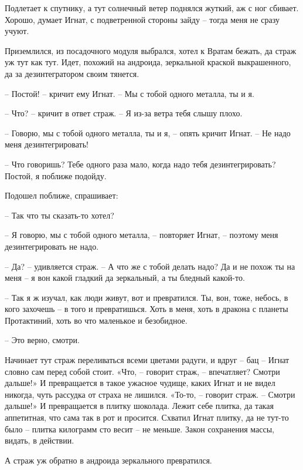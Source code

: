 \documentclass[ebook,oneside,final,openright]{memoir}
\begin{document}
\par
Подлетает к спутнику, а тут солнечный ветер поднялся жуткий, аж с ног сбивает. Хорошо, думает Игнат, с подветренной стороны зайду – тогда меня не сразу учуют. \par
\par
 Приземлился, из посадочного модуля выбрался, хотел к Вратам бежать, да страж уж тут как тут. Идет, похожий на андроида, зеркальной краской выкрашенного, да за дезинтегратором своим тянется. \par
 \par
– Постой! – кричит ему Игнат. – Мы с тобой одного металла, ты и я. \par
– Что? – кричит в ответ страж. – Я из-за ветра тебя слышу плохо. \par
– Говорю, мы с тобой одного металла, ты и я, – опять кричит Игнат. – Не надо меня дезинтегрировать!\par
– Что говоришь? Тебе одного раза мало, когда надо тебя дезинтегрировать? Постой, я поближе подойду. \par
Подошел поближе, спрашивает: \par
– Так что ты сказать-то хотел? \par
– Я говорю, мы с тобой одного металла, – повторяет Игнат, – поэтому меня дезинтегрировать не надо. \par
– Да? – удивляется страж. – А что же с тобой делать надо? Да и не похож ты на меня – я вон какой гладкий да зеркальный, а ты бледный какой-то. \par
– Так я ж изучал, как люди живут, вот и превратился. Ты, вон, тоже, небось, в кого захочешь – в того и превратишься. Хоть в меня, хоть в дракона с планеты Протактиний, хоть во что маленькое и безобидное. \par
– Это верно, смотри. \par
\par
Начинает тут страж переливаться всеми цветами радуги, и вдруг – бац – Игнат словно сам перед собой стоит. «Что, – говорит страж, – впечатляет? Смотри дальше!» И превращается в такое ужасное чудище, каких Игнат и не видел никогда, чуть рассудка от страха не лишился. «То-то, – говорит страж. – Смотри дальше!» И превращается в плитку шоколада. Лежит себе плитка, да такая аппетитная, что сама так в рот и просится. Схватил Игнат плитку, да не тут-то было – плитка килограмм сто весит – не меньше. Закон сохранения массы, видать, в действии. \par
\par
А страж уж обратно в андроида зеркального превратился. \par
\end{document}
